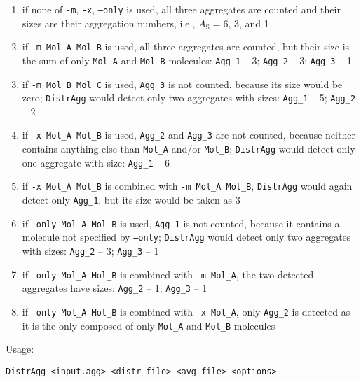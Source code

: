 \begin{enumerate}[nosep]
  \item if none of \texttt{-m}, \texttt{-x}, \texttt{--only} is used, all
    three aggregates are counted and their sizes are their aggregation
    numbers, i.e., $A_{\mathrm{S}}=6$, 3, and 1
  \item if \texttt{-m Mol\_A Mol\_B} is used, all three aggregates are
    counted, but their size is the sum of only \texttt{Mol\_A} and
    \texttt{Mol\_B} molecules: \texttt{Agg\_1} -- 3; \texttt{Agg\_2} -- 3;
    \texttt{Agg\_3} -- 1
  \item if \texttt{-m Mol\_B Mol\_C} is used, \texttt{Agg\_3} is not
    counted, because its size would be zero; \texttt{DistrAgg} would detect
    only two aggregates with sizes: \texttt{Agg\_1} -- 5; \texttt{Agg\_2} --
    2
  \item if \texttt{-x Mol\_A Mol\_B} is used, \texttt{Agg\_2} and
    \texttt{Agg\_3} are not counted, because neither contains anything else
    than \texttt{Mol\_A} and/or \texttt{Mol\_B}; \texttt{DistrAgg} would
    detect only one aggregate with size: \texttt{Agg\_1} -- 6
  \item if \texttt{-x Mol\_A Mol\_B} is combined with \texttt{-m Mol\_A
    Mol\_B}, \texttt{DistrAgg} would again detect only \texttt{Agg\_1}, but
    its size would be taken as 3
  \item if \texttt{--only Mol\_A Mol\_B} is used, \texttt{Agg\_1} is not
    counted, because it contains a molecule not specified by
    \texttt{--only}; \texttt{DistrAgg} would detect only two aggregates
    with sizes: \texttt{Agg\_2} -- 3; \texttt{Agg\_3} -- 1
  \item if \texttt{--only Mol\_A Mol\_B} is combined with \texttt{-m
    Mol\_A}, the two detected aggregates have sizes: \texttt{Agg\_2} -- 1;
    \texttt{Agg\_3} -- 1
  \item if \texttt{--only Mol\_A Mol\_B} is combined with \texttt{-x
    Mol\_A}, only \texttt{Agg\_2} is detected as it is the only composed of
    only \texttt{Mol\_A} and \texttt{Mol\_B} molecules
\end{enumerate}

Usage:

\vspace{1em}
\noindent
\texttt{DistrAgg <input.agg> <distr file> <avg file> <options>}


